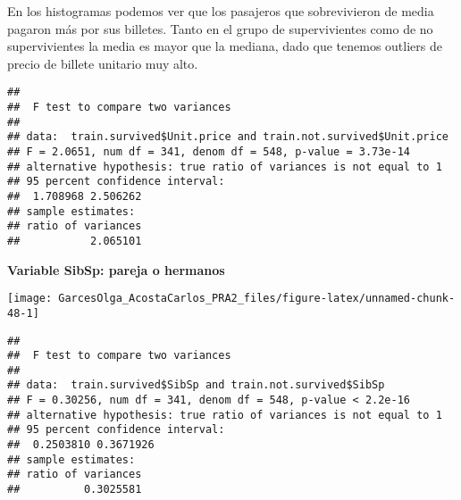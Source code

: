 \documentclass[
]{article}
\newenvironment{Shaded}{\begin{snugshade}}{\end{snugshade}}
\newcommand{\KeywordTok}[1]{\textcolor[rgb]{0.94,0.87,0.69}{#1}}
\newcommand{\NormalTok}[1]{\textcolor[rgb]{0.80,0.80,0.80}{#1}}
\newcommand{\OperatorTok}[1]{\textcolor[rgb]{0.94,0.94,0.82}{#1}}
\newcommand{\StringTok}[1]{\textcolor[rgb]{0.80,0.58,0.58}{#1}}
\begin{document}
En los histogramas podemos ver que los pasajeros que sobrevivieron de
media pagaron más por sus billetes. Tanto en el grupo de supervivientes
como de no supervivientes la media es mayor que la mediana, dado que
tenemos outliers de precio de billete unitario muy alto.

\begin{Shaded}
\end{Shaded}

\begin{verbatim}
## 
##  F test to compare two variances
## 
## data:  train.survived$Unit.price and train.not.survived$Unit.price
## F = 2.0651, num df = 341, denom df = 548, p-value = 3.73e-14
## alternative hypothesis: true ratio of variances is not equal to 1
## 95 percent confidence interval:
##  1.708968 2.506262
## sample estimates:
## ratio of variances 
##           2.065101
\end{verbatim}

\textbf{Variable SibSp: pareja o hermanos}

\begin{Shaded}
\end{Shaded}

\begin{center}\texttt{[image: GarcesOlga\_AcostaCarlos\_PRA2\_files/figure-latex/unnamed-chunk-48-1]} \end{center}

\begin{Shaded}
\end{Shaded}

\begin{verbatim}
## 
##  F test to compare two variances
## 
## data:  train.survived$SibSp and train.not.survived$SibSp
## F = 0.30256, num df = 341, denom df = 548, p-value < 2.2e-16
## alternative hypothesis: true ratio of variances is not equal to 1
## 95 percent confidence interval:
##  0.2503810 0.3671926
## sample estimates:
## ratio of variances 
##          0.3025581
\end{verbatim}
\end{document}

